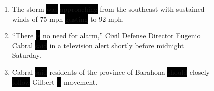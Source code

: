 \begin{figure}
{\begin{minipage}{\textwidth}
\begin{minipage}[t]{0.45\textwidth}
\begin{singlespace}
\begin{enumerate}
\item The storm \colorbox{black}{was} \colorbox{black}{approaching} from the southeast with sustained winds of 75 mph \colorbox{black}{gusting} to 92 mph.
\item ``There \colorbox{black}{is} no need for alarm,'' Civil Defense Director Eugenio Cabral \colorbox{black}{said} in a television alert shortly before midnight Saturday.
\item Cabral \colorbox{black}{said} residents of the province of Barahona \colorbox{black}{should} closely \colorbox{black}{follow} Gilbert \colorbox{black}{'s} movement.
\end{enumerate}
\end{singlespace}
\end{minipage}

~\\
~\\


\end{minipage}}
\end{figure}
